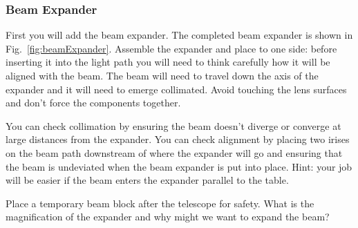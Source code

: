 \documentclass[a4paper]{report}
\begin{document}
\clearpage

\subsubsection{Beam Expander}
First you will add the beam expander. 
The completed beam expander is shown in Fig.~\ref{fig:beamExpander}. 
Assemble the expander and place to one side: before inserting it into the light path you will need to think carefully how it will be aligned with the beam. 
The beam will need to travel down the axis of the expander and it will need to emerge collimated.
Avoid touching the lens surfaces and don't force the components together. 

You can check collimation by ensuring the beam doesn't diverge or converge at large distances from the expander. 
You can check alignment by placing two irises on the beam path downstream of where the expander will go and ensuring that the beam is undeviated when the beam expander is put into place. 
Hint: your job will be easier if the beam enters the expander parallel to the table. 

Place a temporary beam block after the telescope for safety.
What is the magnification of the expander and why might we want to expand the beam?
\end{document}
